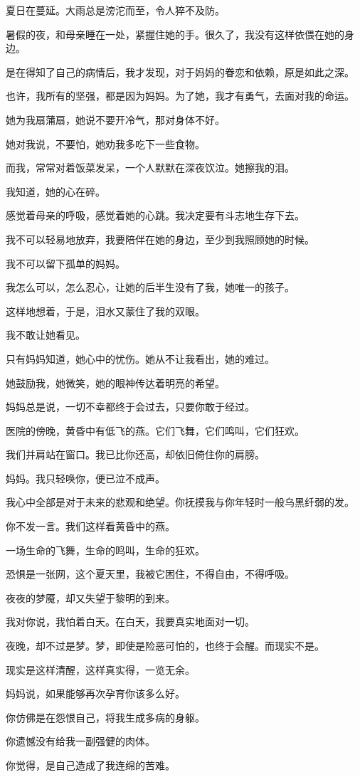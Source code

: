 \documentclass[12pt,a4paper]{article}
\def\blankrev{\vspace{1ex}}									%
\begin{document}
		\blankrev
		夏日在蔓延。大雨总是滂沱而至，令人猝不及防。\par
		暑假的夜，和母亲睡在一处，紧握住她的手。很久了，我没有这样依偎在她的身边。\par
		是在得知了自己的病情后，我才发现，对于妈妈的眷恋和依赖，原是如此之深。\par
		也许，我所有的坚强，都是因为妈妈。为了她，我才有勇气，去面对我的命运。\par
		她为我扇蒲扇，她说不要开冷气，那对身体不好。\par
		她对我说，不要怕，她劝我多吃下一些食物。\par
		而我，常常对着饭菜发呆，一个人默默在深夜饮泣。她擦我的泪。\par
		我知道，她的心在碎。\par
		感觉着母亲的呼吸，感觉着她的心跳。我决定要有斗志地生存下去。\par
		我不可以轻易地放弃，我要陪伴在她的身边，至少到我照顾她的时候。\par
		我不可以留下孤单的妈妈。\par
		我怎么可以，怎么忍心，让她的后半生没有了我，她唯一的孩子。\par
		这样地想着，于是，泪水又蒙住了我的双眼。\par
		我不敢让她看见。

		\blankrev
		只有妈妈知道，她心中的忧伤。她从不让我看出，她的难过。\par
		她鼓励我，她微笑，她的眼神传达着明亮的希望。\par
		妈妈总是说，一切不幸都终于会过去，只要你敢于经过。\par
		医院的傍晚，黄昏中有低飞的燕。它们飞舞，它们鸣叫，它们狂欢。\par
		我们并肩站在窗口。我已比你还高，却依旧倚住你的肩膀。\par
		妈妈。我只轻唤你，便已泣不成声。\par
		我心中全部是对于未来的悲观和绝望。你抚摸我与你年轻时一般乌黑纤弱的发。\par
		你不发一言。我们这样看黄昏中的燕。\par
		一场生命的飞舞，生命的鸣叫，生命的狂欢。\par
		恐惧是一张网，这个夏天里，我被它困住，不得自由，不得呼吸。\par
		夜夜的梦魇，却又失望于黎明的到来。\par
		我对你说，我怕着白天。在白天，我要真实地面对一切。\par
		夜晚，却不过是梦。梦，即使是险恶可怕的，也终于会醒。而现实不是。\par
		现实是这样清醒，这样真实得，一览无余。\par
		妈妈说，如果能够再次孕育你该多么好。\par
		你仿佛是在怨恨自己，将我生成多病的身躯。\par
		你遗憾没有给我一副强健的肉体。\par
		你觉得，是自己造成了我连绵的苦难。
\end{document}

